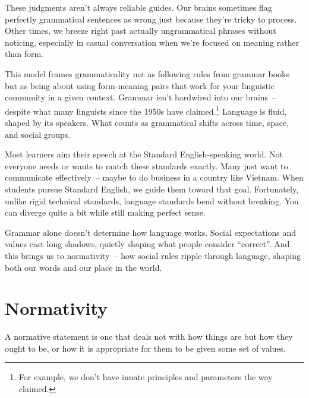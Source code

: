 These judgments aren't always reliable guides. Our brains sometimes flag perfectly grammatical sentences as wrong just because they're tricky to process. Other times, we breeze right past actually ungrammatical phrases without noticing, especially in casual conversation when we're focused on meaning rather than form.

This model frames grammaticality not as following rules from grammar books but as being about using form-meaning pairs that work for your linguistic community in a given context. Grammar isn't hardwired into our brains~-- despite what many linguists since the 1950s have claimed.\footnote{For example, we don't have innate principles and parameters the way \citet{chomsky1981lectures} claimed.} Language is fluid, shaped by its speakers. What counts as grammatical shifts across time, space, and social groups.

Most learners aim their speech at the Standard English-speaking world. Not everyone needs or wants to match these standards exactly. Many just want to communicate effectively~-- maybe to do business in a country like Vietnam. When students pursue Standard English, we guide them toward that goal. Fortunately, unlike rigid technical standards, language standards bend without breaking. You can diverge quite a bit while still making perfect sense.

Grammar alone doesn't determine how language works. Social expectations and values cast long shadows, quietly shaping what people consider ``correct''. And this brings us to normativity~-- how social rules ripple through language, shaping both our words and our place in the world.

\section{Normativity}\label{sec:normativity}

A normative statement is one that deals not with how things are but how they ought to be, or how it is appropriate for them to be given some set of values.

